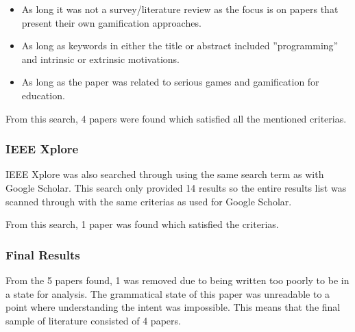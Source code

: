 \begin{itemize}
    \item As long it was not a survey/literature review as the focus is on papers that present their own gamification approaches.  
    \item As long as keywords in either the title or abstract included ''programming'' and intrinsic or extrinsic motivations. 
    \item As long as the paper was related to serious games and gamification for education. 
\end{itemize}

From this search, 4 papers were found which satisfied all the mentioned criterias. 

\subsubsection{IEEE Xplore}
IEEE Xplore was also searched through using the same search term as with Google Scholar. This search only provided 14 results so the entire results list was scanned through with the same criterias as used for Google Scholar. 

From this search, 1 paper was found which satisfied the criterias. 

\subsubsection{Final Results} 
From the 5 papers found, 1 was removed due to being written too poorly to be in a state for analysis. The grammatical state of this paper was unreadable to a point where understanding the intent was impossible. This means that the final sample of literature consisted of 4 papers. 
